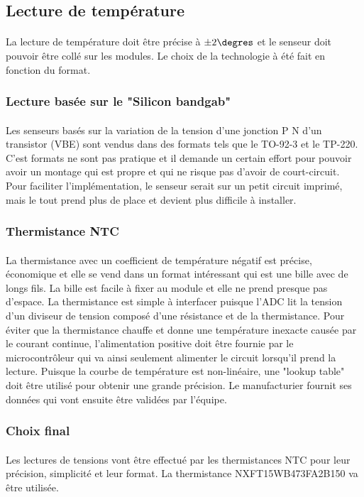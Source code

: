 

\subsection{Lecture de température}
	\paragraph*{}
	La lecture de température doit être précise à $\pm 2\degres$ et le senseur doit pouvoir être collé sur les modules. Le choix de la technologie à été fait en fonction du format. 
	
	\subsubsection*{Lecture basée sur le "Silicon bandgab"}
	\paragraph*{}
	Les senseurs basés sur la variation de la tension d'une jonction P N d'un transistor (VBE) sont vendus dans des formats tels que le TO-92-3 et le TP-220. C'est formats ne sont pas pratique et il demande un certain effort pour pouvoir avoir un montage qui est propre et qui ne risque pas d'avoir de court-circuit. Pour faciliter l'implémentation, le senseur serait sur un petit circuit imprimé, mais le tout prend plus de place et devient plus difficile à installer.
	
	\subsubsection*{Thermistance NTC}
	\paragraph*{}
	La thermistance avec un coefficient de température négatif est précise, économique et elle se vend dans un format intéressant qui est une bille avec de longs fils. La bille est facile à fixer au module et elle ne prend presque pas d'espace. La thermistance est simple à interfacer puisque l'ADC lit la tension d'un diviseur de tension composé d'une résistance et de la thermistance. Pour éviter que la thermistance chauffe et donne une température inexacte causée par le courant continue, l'alimentation positive doit être fournie par le microcontrôleur qui va ainsi seulement alimenter le circuit lorsqu'il prend la lecture. Puisque la courbe de température est non-linéaire, une "lookup table" doit être utilisé pour obtenir une grande précision. Le manufacturier fournit ses données qui vont ensuite être validées par l'équipe.  
	
	\subsubsection*{Choix final}
	\paragraph*{}
	Les lectures de tensions vont être effectué par les thermistances NTC pour leur précision, simplicité et leur format. La thermistance NXFT15WB473FA2B150 va être utilisée.	